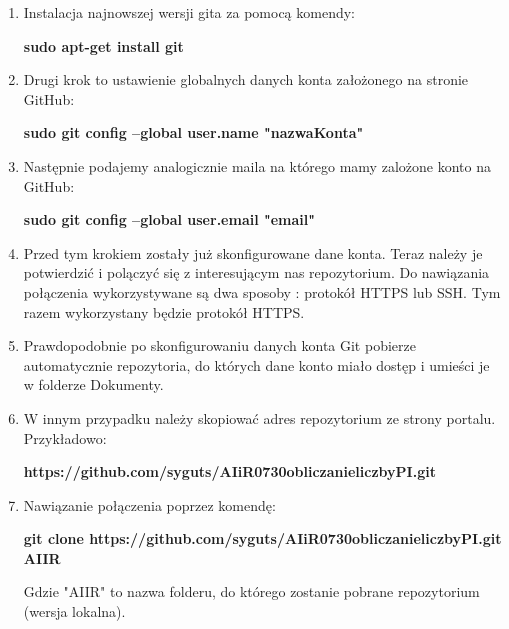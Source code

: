 \documentclass[a4paper,12pt]{article}		%
\begin{document}
\begin{enumerate}
\item Instalacja najnowszej wersji gita za pomocą komendy:
\begin{center}
\textbf{sudo apt-get install git}
\end{center}

\item Drugi krok to ustawienie globalnych danych konta założonego na stronie GitHub:
\begin{center}
\textbf{sudo git config --global user.name "nazwaKonta" }
\end{center}

\item Następnie podajemy analogicznie maila na którego mamy zalożone konto na GitHub:
\begin{center}
\textbf{sudo git config --global user.email "email"}
\end{center}

\item Przed tym krokiem zostały już skonfigurowane dane konta.  Teraz należy je potwierdzić i polączyć się z interesującym nas repozytorium. Do nawiązania połączenia wykorzystywane są dwa sposoby : protokół HTTPS lub SSH. Tym razem wykorzystany będzie protokół HTTPS.

\item Prawdopodobnie po skonfigurowaniu danych konta Git pobierze automatycznie repozytoria, do których dane konto miało dostęp i umieści je w folderze Dokumenty.

\item W innym przypadku należy skopiować adres repozytorium ze strony portalu. Przykładowo:
\begin{center}
\textbf{https://github.com/syguts/AIiR0730obliczanieliczbyPI.git}
\end{center}

\item Nawiązanie połączenia poprzez komendę:
\begin{center}
\textbf{git clone https://github.com/syguts/AIiR0730obliczanieliczbyPI.git AIIR}
\end{center}
Gdzie "AIIR" to nazwa folderu, do którego zostanie pobrane repozytorium (wersja lokalna).
\end{enumerate}
\end{document}
